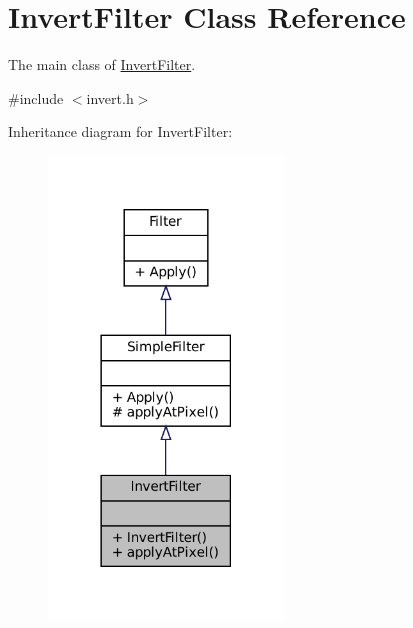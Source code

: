 \hypertarget{classInvertFilter}{}\section{Invert\+Filter Class Reference}
\label{classInvertFilter}


The main class of \hyperlink{classInvertFilter}{Invert\+Filter}.  




{\ttfamily \#include $<$invert.\+h$>$}



Inheritance diagram for Invert\+Filter\+:
\nopagebreak
\begin{figure}[H]
\begin{center}
\leavevmode
\includegraphics[width=177pt]{classInvertFilter__inherit__graph}
\end{center}
\end{figure}


